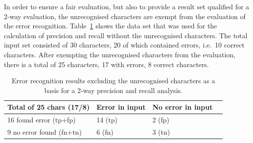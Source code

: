 In order to ensure a fair evaluation, but also to provide 
a result set qualified for a 2-way evaluation, the unrecognised characters are 
exempt from the evaluation of the error recognition.
Table~\ref{table:eval:resultsprecisionandrecallnumbersunrecognisedexempt}
shows the data set that was used for the calculation of precision and recall
without the unrecognised characters. The total input set consisted of 30 characters, 20 of which contained errors, i.e.\ 10 correct characters.
After exempting the unrecognised characters from the evaluation, 
there is a total of 25 characters, 17 with errors, 8 correct characters.
\begin{table}[htbp]
\begin{center}
  \begin{tabular}{|l|l|l|p{200pt}|}
    \hline
    Total of 25 chars (17/8)  & Error in input      & No error in input \\
    \hline
    16 found error (tp+fp)    & 14 (tp)             & 2 (fp) \\
    \hline
    9 no error found (fn+tn)  & 6 (fn)              & 3 (tn) \\
    \hline
  \end{tabular}
\end{center}
\caption{Error recognition results excluding the unrecognised characters as a
basis for a 2-way precision and recall analysis.}
\label{table:eval:resultsprecisionandrecallnumbersunrecognisedexempt}
\end{table}

